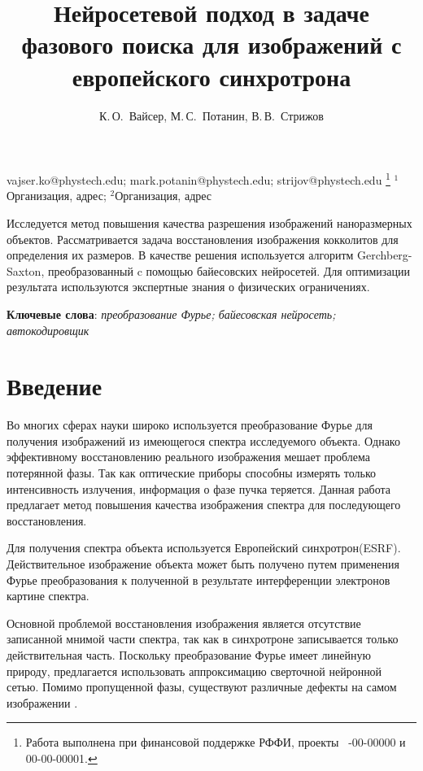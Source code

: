 \documentclass[12pt, twoside]{article}
\begin{document}
\title
    [Шаблон статьи для публикации] %
    {Нейросетевой подход в задаче фазового поиска для изображений с европейского синхротрона}
\author
    { К.\,О.~Вайсер, М.\,С.~Потанин, В.\,В.~Стрижов} %

\email
    {vajser.ko@phystech.edu; mark.potanin@phystech.edu;  strijov@phystech.edu}
\thanks
    {Работа выполнена при
     финансовой поддержке РФФИ, проекты \No\ -00-00000 и 00-00-00001.}
\organization
    {$^1$Организация, адрес; $^2$Организация, адрес}
\abstract
    {
    	Исследуется метод повышения качества разрешения изображений наноразмерных объектов. Рассматривается задача восстановления изображения кокколитов для определения их размеров. В качестве решения используется алгоритм Gerchberg-Saxton, преобразованный c помощью байесовских нейросетей. Для оптимизации результата используются экспертные знания о физических ограничениях. 
	
	
\bigskip
\noindent
\textbf{Ключевые слова}: \emph {преобразование Фурье; байесовская нейросеть; автокодировщик}
}


\maketitle


\section{Введение}
Во многих сферах науки широко используется преобразование Фурье для получения изображений из имеющегося спектра исследуемого объекта. Однако эффективному восстановлению реального изображения мешает проблема потерянной фазы. Так как оптические приборы способны измерять только интенсивность излучения, информация о фазе пучка теряется. Данная работа предлагает метод повышения качества изображения спектра для последующего восстановления.

Для получения спектра объекта используется Европейский синхротрон(ESRF). Действительное изображение объекта может быть получено путем применения Фурье преобразования к полученной в результате интерференции электронов картине спектра.

Основной проблемой восстановления изображения является отсутствие записанной мнимой части спектра, так как в синхротроне записывается только действительная часть. Поскольку преобразование Фурье имеет линейную природу, предлагается использовать аппроксимацию сверточной нейронной сетью. Помимо пропущенной фазы, существуют различные дефекты на самом изображении \cite{latychevskaia2018iterative}. 
\end{document}
